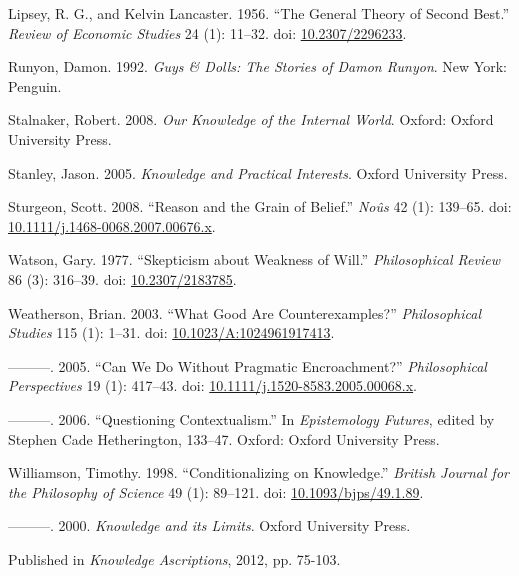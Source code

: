 \documentclass[
  11pt,
  letterpaper,
  DIV=11,
  numbers=noendperiod,
  twoside]{scrartcl}
\newlength{\cslhangindent}
\newenvironment{CSLReferences}[2] %
 {\begin{list}{}{%
  \setlength{\itemindent}{0pt}
  \setlength{\leftmargin}{0pt}
  \setlength{\parsep}{0pt}
  \ifodd #1
   \setlength{\leftmargin}{\cslhangindent}
   \setlength{\itemindent}{-1\cslhangindent}
  \fi
  \setlength{\itemsep}{#2\baselineskip}}}
 {\end{list}}
\begin{document}
\begin{CSLReferences}{1}{0}
Lipsey, R. G., and Kelvin Lancaster. 1956. {``The General Theory of
Second Best.''} \emph{Review of Economic Studies} 24 (1): 11--32. doi:
\href{https://doi.org/10.2307/2296233}{10.2307/2296233}.

Runyon, Damon. 1992. \emph{Guys \& Dolls: The Stories of {D}amon
{R}unyon}. New York: Penguin.

Stalnaker, Robert. 2008. \emph{Our Knowledge of the Internal World}.
Oxford: Oxford University Press.

Stanley, Jason. 2005. \emph{{Knowledge and Practical Interests}}. Oxford
University Press.

Sturgeon, Scott. 2008. {``Reason and the Grain of Belief.''}
\emph{No{û}s} 42 (1): 139--65. doi:
\href{https://doi.org/10.1111/j.1468-0068.2007.00676.x}{10.1111/j.1468-0068.2007.00676.x}.

Watson, Gary. 1977. {``Skepticism about Weakness of Will.''}
\emph{Philosophical Review} 86 (3): 316--39. doi:
\href{https://doi.org/10.2307/2183785}{10.2307/2183785}.

Weatherson, Brian. 2003. {``{What Good Are Counterexamples?}''}
\emph{Philosophical Studies} 115 (1): 1--31. doi:
\href{https://doi.org/10.1023/A:1024961917413}{10.1023/A:1024961917413}.

---------. 2005. {``{Can We Do Without Pragmatic Encroachment?}''}
\emph{Philosophical Perspectives} 19 (1): 417--43. doi:
\href{https://doi.org/10.1111/j.1520-8583.2005.00068.x}{10.1111/j.1520-8583.2005.00068.x}.

---------. 2006. {``Questioning Contextualism.''} In \emph{Epistemology
Futures}, edited by Stephen Cade Hetherington, 133--47. Oxford: Oxford
University Press.

Williamson, Timothy. 1998. {``{Conditionalizing on Knowledge}.''}
\emph{British Journal for the Philosophy of Science} 49 (1): 89--121.
doi: \href{https://doi.org/10.1093/bjps/49.1.89}{10.1093/bjps/49.1.89}.

---------. 2000. \emph{{Knowledge and its Limits}}. Oxford University
Press.

\end{CSLReferences}



\noindent Published in\emph{
Knowledge Ascriptions}, 2012, pp. 75-103.
\end{document}
